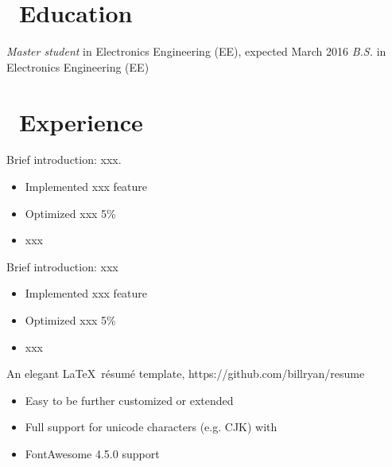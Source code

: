 \documentclass{resume}
\begin{document}



  \section{\faGraduationCap\ Education}
  \textit{Master student} in Electronics Engineering (EE), expected March 2016 
  \textit{B.S.} in Electronics Engineering (EE)

  \section{\faUsers\ Experience}
   
  Brief introduction: xxx.
  \begin{itemize}
    \item Implemented xxx feature

    \item Optimized xxx 5\%

    \item xxx
  \end{itemize}

   
  Brief introduction: xxx
  \begin{itemize}
    \item Implemented xxx feature

    \item Optimized xxx 5\%

    \item xxx
  \end{itemize}

   
  An elegant \LaTeX\ résumé template, https://github.com/billryan/resume
  \begin{itemize}
    \item Easy to be further customized or extended

    \item Full support for unicode characters (e.g. CJK) with \XeLaTeX\


    \item FontAwesome 4.5.0 support
  \end{itemize}
\end{document}
